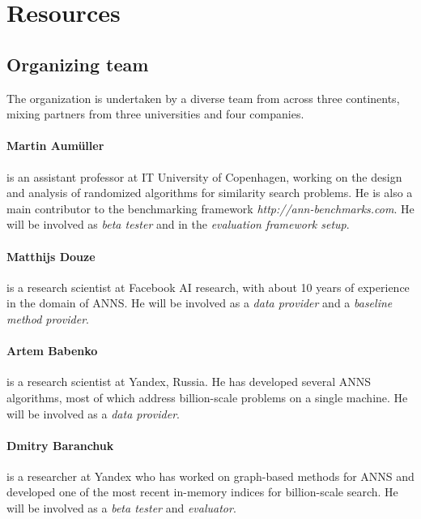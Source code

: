 

\section{Resources}

\subsection{Organizing team}




The organization is undertaken by a diverse team from across three continents, mixing partners from three universities and four companies. 



\paragraph{Martin Aum\"uller} is an assistant professor at IT University of Copenhagen,
working on the design and analysis of randomized algorithms for similarity search problems.
He is also a main contributor to the benchmarking framework \emph{http://ann-benchmarks.com}. 
He will be involved as \emph{beta tester} and in the \emph{evaluation framework setup}.

\paragraph{Matthijs Douze} 
is a research scientist at Facebook AI research, with about 10 years of experience in the domain of ANNS. 
He will be involved as a \emph{data provider} and a \emph{baseline method provider}.

\paragraph{Artem Babenko} 
is a research scientist at Yandex, Russia. He has developed several ANNS algorithms, most of which address billion-scale problems on a single machine.
He will be involved as a \emph{data provider}.

\paragraph{Dmitry Baranchuk}
is a researcher at Yandex who has worked on graph-based methods for ANNS and developed one of the most recent in-memory indices for billion-scale search. He will be involved as a \emph{beta tester} and \emph{evaluator}.

